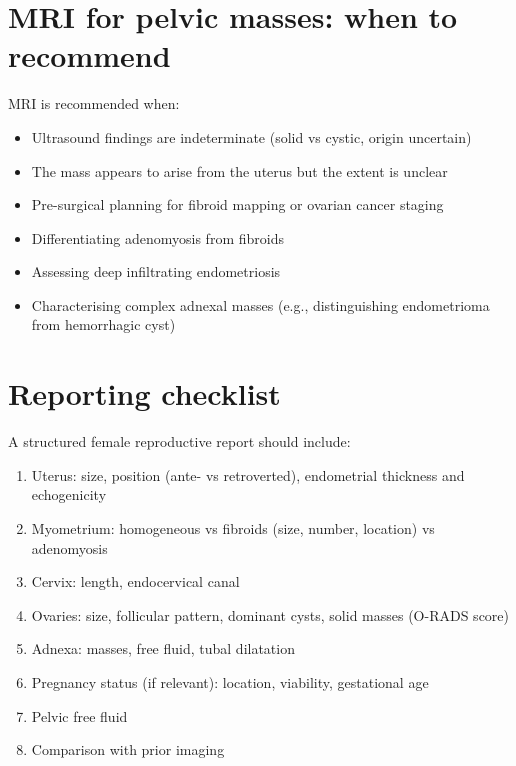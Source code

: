 \section{MRI for pelvic masses: when to recommend}
MRI is recommended when:
\begin{itemize}
    \item Ultrasound findings are indeterminate (solid vs cystic, origin uncertain)
    \item The mass appears to arise from the uterus but the extent is unclear
    \item Pre-surgical planning for fibroid mapping or ovarian cancer staging
    \item Differentiating adenomyosis from fibroids
    \item Assessing deep infiltrating endometriosis
    \item Characterising complex adnexal masses (e.g., distinguishing endometrioma from hemorrhagic cyst)
\end{itemize}

\section{Reporting checklist}
A structured female reproductive report should include:
\begin{enumerate}
    \item Uterus: size, position (ante- vs retroverted), endometrial thickness and echogenicity
    \item Myometrium: homogeneous vs fibroids (size, number, location) vs adenomyosis
    \item Cervix: length, endocervical canal
    \item Ovaries: size, follicular pattern, dominant cysts, solid masses (O-RADS score)
    \item Adnexa: masses, free fluid, tubal dilatation
    \item Pregnancy status (if relevant): location, viability, gestational age
    \item Pelvic free fluid
    \item Comparison with prior imaging
\end{enumerate}

\clearpage
